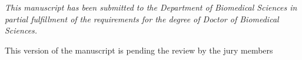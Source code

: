 
\vspace*{\fill}
\begin{center}
{\it This manuscript has been submitted to the Department of Biomedical Sciences 
in partial fulfillment of the requirements for the degree of Doctor of Biomedical Sciences.

\vskip1cm

This version of the manuscript is pending the 
review by the jury members
}%
\end{center}
\vspace*{\fill}
\vspace*{\fill}
\vspace*{\fill}
